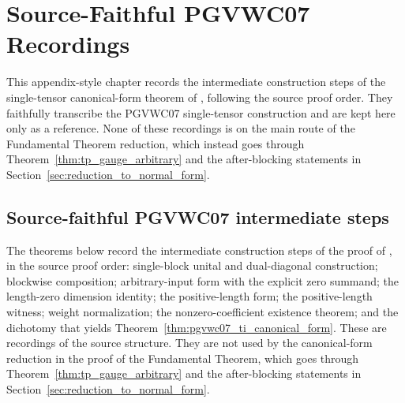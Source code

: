 \chapter{Source-Faithful PGVWC07 Recordings}\label{ch:pgvwc07_recordings}

This appendix-style chapter records the intermediate construction steps of the
single-tensor canonical-form theorem of
\cite[Theorem~Th:TIcanonical]{PerezGarcia2007Matrix}, following the source proof
order. They faithfully transcribe the PGVWC07 single-tensor construction and are
kept here only as a reference. None of these recordings is on the main route of
the Fundamental Theorem reduction, which instead goes through
Theorem~\ref{thm:tp_gauge_arbitrary} and the after-blocking statements in
Section~\ref{sec:reduction_to_normal_form}.

\section{Source-faithful PGVWC07 intermediate steps}\label{sec:pgvwc07_intermediates}

The theorems below record the intermediate construction steps of the proof of
\cite[Theorem~Th:TIcanonical]{PerezGarcia2007Matrix}, in the source proof order:
single-block unital and dual-diagonal construction; blockwise composition;
arbitrary-input form with the explicit zero summand; the length-zero dimension
identity; the positive-length form; the positive-length witness; weight
normalization; the nonzero-coefficient existence theorem; and the dichotomy that
yields Theorem~\ref{thm:pgvwc07_ti_canonical_form}. These are recordings of the
source structure. They are not used by the canonical-form reduction in the proof
of the Fundamental Theorem, which goes through
Theorem~\ref{thm:tp_gauge_arbitrary} and the after-blocking statements in
Section~\ref{sec:reduction_to_normal_form}.

